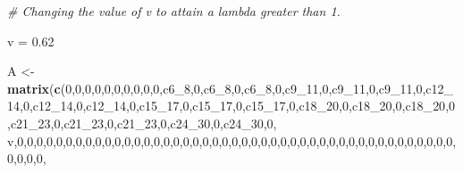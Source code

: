 \documentclass[]{article}
\newenvironment{Shaded}{\begin{snugshade}}{\end{snugshade}}
\newcommand{\CommentTok}[1]{\textcolor[rgb]{0.56,0.35,0.01}{\textit{#1}}}
\newcommand{\DecValTok}[1]{\textcolor[rgb]{0.00,0.00,0.81}{#1}}
\newcommand{\FloatTok}[1]{\textcolor[rgb]{0.00,0.00,0.81}{#1}}
\newcommand{\KeywordTok}[1]{\textcolor[rgb]{0.13,0.29,0.53}{\textbf{#1}}}
\newcommand{\NormalTok}[1]{#1}
\newcommand{\StringTok}[1]{\textcolor[rgb]{0.31,0.60,0.02}{#1}}
\begin{document}
\begin{Shaded}
\begin{Highlighting}[]
\CommentTok{# Changing the value of v to attain a lambda greater than 1.}

\NormalTok{v =}\StringTok{ }\FloatTok{0.62}

\NormalTok{A <-}\StringTok{ }\KeywordTok{matrix}\NormalTok{(}\KeywordTok{c}\NormalTok{(}\DecValTok{0}\NormalTok{,}\DecValTok{0}\NormalTok{,}\DecValTok{0}\NormalTok{,}\DecValTok{0}\NormalTok{,}\DecValTok{0}\NormalTok{,}\DecValTok{0}\NormalTok{,}\DecValTok{0}\NormalTok{,}\DecValTok{0}\NormalTok{,}\DecValTok{0}\NormalTok{,}\DecValTok{0}\NormalTok{,c6_}\DecValTok{8}\NormalTok{,}\DecValTok{0}\NormalTok{,c6_}\DecValTok{8}\NormalTok{,}\DecValTok{0}\NormalTok{,c6_}\DecValTok{8}\NormalTok{,}\DecValTok{0}\NormalTok{,c9_}\DecValTok{11}\NormalTok{,}\DecValTok{0}\NormalTok{,c9_}\DecValTok{11}\NormalTok{,}\DecValTok{0}\NormalTok{,c9_}\DecValTok{11}\NormalTok{,}\DecValTok{0}\NormalTok{,c12_}\DecValTok{14}\NormalTok{,}\DecValTok{0}\NormalTok{,c12_}\DecValTok{14}\NormalTok{,}\DecValTok{0}\NormalTok{,c12_}\DecValTok{14}\NormalTok{,}\DecValTok{0}\NormalTok{,c15_}\DecValTok{17}\NormalTok{,}\DecValTok{0}\NormalTok{,c15_}\DecValTok{17}\NormalTok{,}\DecValTok{0}\NormalTok{,c15_}\DecValTok{17}\NormalTok{,}\DecValTok{0}\NormalTok{,c18_}\DecValTok{20}\NormalTok{,}\DecValTok{0}\NormalTok{,c18_}\DecValTok{20}\NormalTok{,}\DecValTok{0}\NormalTok{,c18_}\DecValTok{20}\NormalTok{,}\DecValTok{0}\NormalTok{,c21_}\DecValTok{23}\NormalTok{,}\DecValTok{0}\NormalTok{,c21_}\DecValTok{23}\NormalTok{,}\DecValTok{0}\NormalTok{,c21_}\DecValTok{23}\NormalTok{,}\DecValTok{0}\NormalTok{,c24_}\DecValTok{30}\NormalTok{,}\DecValTok{0}\NormalTok{,c24_}\DecValTok{30}\NormalTok{,}\DecValTok{0}\NormalTok{,}
\NormalTok{v,}\DecValTok{0}\NormalTok{,}\DecValTok{0}\NormalTok{,}\DecValTok{0}\NormalTok{,}\DecValTok{0}\NormalTok{,}\DecValTok{0}\NormalTok{,}\DecValTok{0}\NormalTok{,}\DecValTok{0}\NormalTok{,}\DecValTok{0}\NormalTok{,}\DecValTok{0}\NormalTok{,}\DecValTok{0}\NormalTok{,}\DecValTok{0}\NormalTok{,}\DecValTok{0}\NormalTok{,}\DecValTok{0}\NormalTok{,}\DecValTok{0}\NormalTok{,}\DecValTok{0}\NormalTok{,}\DecValTok{0}\NormalTok{,}\DecValTok{0}\NormalTok{,}\DecValTok{0}\NormalTok{,}\DecValTok{0}\NormalTok{,}\DecValTok{0}\NormalTok{,}\DecValTok{0}\NormalTok{,}\DecValTok{0}\NormalTok{,}\DecValTok{0}\NormalTok{,}\DecValTok{0}\NormalTok{,}\DecValTok{0}\NormalTok{,}\DecValTok{0}\NormalTok{,}\DecValTok{0}\NormalTok{,}\DecValTok{0}\NormalTok{,}\DecValTok{0}\NormalTok{,}\DecValTok{0}\NormalTok{,}\DecValTok{0}\NormalTok{,}\DecValTok{0}\NormalTok{,}\DecValTok{0}\NormalTok{,}\DecValTok{0}\NormalTok{,}\DecValTok{0}\NormalTok{,}\DecValTok{0}\NormalTok{,}\DecValTok{0}\NormalTok{,}\DecValTok{0}\NormalTok{,}\DecValTok{0}\NormalTok{,}\DecValTok{0}\NormalTok{,}\DecValTok{0}\NormalTok{,}\DecValTok{0}\NormalTok{,}\DecValTok{0}\NormalTok{,}\DecValTok{0}\NormalTok{,}\DecValTok{0}\NormalTok{,}\DecValTok{0}\NormalTok{,}\DecValTok{0}\NormalTok{,}\DecValTok{0}\NormalTok{,}\DecValTok{0}\NormalTok{,}

\end{Highlighting}
\end{Shaded}
\end{document}
